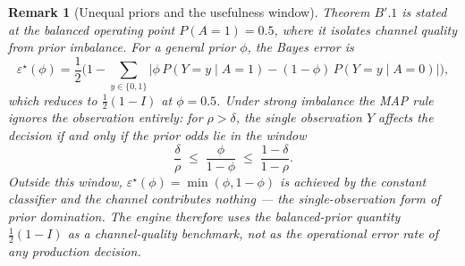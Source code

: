 \documentclass[11pt,a4paper]{article}
\newtheorem{remark}{Remark}
\begin{document}
\begin{remark}[Unequal priors and the usefulness window]
Theorem $B'.1$ is stated at the balanced operating point $P(A{=}1) = 0.5$, where it isolates channel quality from prior imbalance. For a general prior $\phi$, the Bayes error is
\[
\varepsilon^\star(\phi) = \frac{1}{2}\Big(1 - \sum_{y \in \{0,1\}} \big| \phi\, P(Y{=}y \mid A{=}1) - (1-\phi)\, P(Y{=}y \mid A{=}0) \big| \Big), %
\]
which reduces to $\frac{1}{2}(1 - I)$ at $\phi = 0.5$. Under strong imbalance the MAP rule ignores the observation entirely: for $\rho > \delta$, the single observation $Y$ affects the decision if and only if the prior odds lie in the window %
\[
\frac{\delta}{\rho} \;\le\; \frac{\phi}{1 - \phi} \;\le\; \frac{1 - \delta}{1 - \rho}. %
\]
Outside this window, $\varepsilon^\star(\phi) = \min(\phi, 1 - \phi)$ is achieved by the constant classifier and the channel contributes nothing --- the single-observation form of prior domination. The engine therefore uses the balanced-prior quantity $\frac{1}{2}(1 - I)$ as a \emph{channel-quality benchmark}, not as the operational error rate of any production decision. %
\end{remark}
\end{document}

